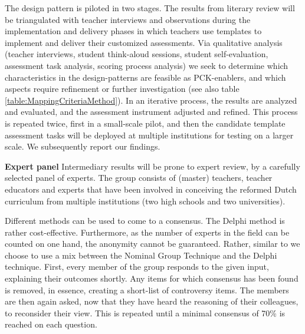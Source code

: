 The design pattern is piloted in two stages. The results from literary review will be triangulated with teacher interviews and observations during the implementation and delivery phases in which teachers use templates to implement and deliver their customized assessments. Via qualitative analysis (teacher interviews, student think-aloud sessions, student self-evaluation, assessment task analysis, scoring process analysis) we seek to determine which characteristics in the design-patterns are feasible as PCK-enablers, and which aspects require refinement or further investigation (see also table \ref{table:MappingCriteriaMethod}). In an iterative process, the results are analyzed and evaluated, and the assessment instrument adjusted and refined. This process is repeated twice, first in a small-scale pilot, and then the candidate template assessment tasks will be deployed at multiple institutions for testing on a larger scale. We subsequently report our findings.



\noindent\textbf{Expert panel}\newline
Intermediary results will be prone to expert review, by a carefully selected panel of experts. The group consists of (master) teachers, teacher educators and experts that have been involved in conceiving the reformed Dutch curriculum from multiple institutions (two high schools and two universities).

Different methods can be used to come to a consensus. The Delphi method is rather cost-effective. Furthermore, as the number of experts in the field can be counted on one hand, the anonymity cannot be guaranteed. Rather, similar to  we choose to use a mix between the Nominal Group Technique and the Delphi technique. First, every member of the group responds to the given input, explaining their outcomes shortly. Any items for which consensus has been found is removed, in essence, creating a short-list of controversy items. The members are then again asked, now that they have heard the reasoning of their colleagues, to reconsider their view. This is repeated until a minimal consensus of 70\% is reached on each question.

